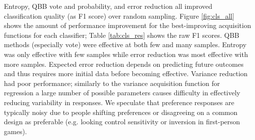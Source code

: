 \documentclass{sig-alternate}
\begin{document}
\begin{table}[tb]
%
\label{tab:cls_res}
\end{table}

Entropy, QBB vote and probability, and error reduction all improved classification quality (as F1 score) over random sampling.
Figure \ref{fig:cls_all} shows the amount of performance improvement for the best-improving acquisition functions for each classifier; Table \ref{tab:cls_res} shows the raw F1 scores.
QBB methods (especially vote) were effective at both few and many samples.
Entropy was only effective with few samples while error reduction was most effective with more samples.
Expected error reduction depends on predicting future outcomes and thus requires more initial data before becoming effective.
Variance reduction had poor performance; similarly to the variance acquisition function for regression a large number of possible parameters causes difficulty in effectively reducing variability in responses.
We speculate that preference responses are typically noisy due to people shifting preferences or disagreeing on a common design as preferable (e.g. looking control sensitivity or inversion in first-person games).
\end{document}
